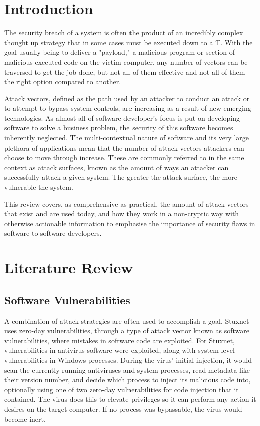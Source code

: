 \documentclass[a4paper, 11pt]{article}
\begin{document}
\tableofcontents


\pagebreak


\section{Introduction}
The security breach of a system is often the product of an incredibly complex thought up strategy \cite{ref:stuxnet2011report} that in some cases must be executed down to a T. With the goal usually being to deliver a "payload," a malicious program or section of malicious executed code on the victim computer, \cite{ref:singer2014cybersecurity} any number of vectors can be traversed to get the job done, but not all of them effective and not all of them the right option compared to another. 

Attack vectors, defined as the path used by an attacker to conduct an attack or to attempt to bypass system controls, \cite{ref:biometricattackvectors} are increasing as a result of new emerging technologies. \cite{ref:jang2014survey} As almost all of software developer's focus is put on developing software to solve a business problem, the security of this software becomes inherently neglected. The multi-contextual nature of software and its very large plethora of applications mean that the number of attack vectors attackers can choose to move through increase. These are commonly referred to in the same context as attack surfaces, known as the amount of ways an attacker can successfully attack a given system. \cite{ref:manadhata2010attack} The greater the attack surface, the more vulnerable the system.

This review covers, as comprehensive as practical, the amount of attack vectors that exist and are used today, and how they work in a non-cryptic way with otherwise actionable information to emphasise the importance of security flaws in software to software developers.

\section{Literature Review}
\subsection{Software Vulnerabilities}
\label{sec:softwarevul}
A combination of attack strategies are often used to accomplish a goal. Stuxnet uses zero-day vulnerabilities, through a type of attack vector known as software vulnerabilities, where mistakes in software code are exploited. \cite{ref:singer2014cybersecurity} For Stuxnet, vulnerabilities in antivirus software were exploited, along with system level vulnerabilities in Windows processes. During the virus' initial injection, it would scan the currently running antiviruses and system processes, read metadata like their version number, and decide which process to inject its malicious code into, optionally using one of two zero-day vulnerabilities for code injection that it contained. \cite{ref:stuxnet2011report} The virus does this to elevate privileges so it can perform any action it desires on the target computer. \cite{ref:stuxnet2011report} If no process was bypassable, the virus would become inert. \cite{ref:stuxnet2011report}
\end{document}
